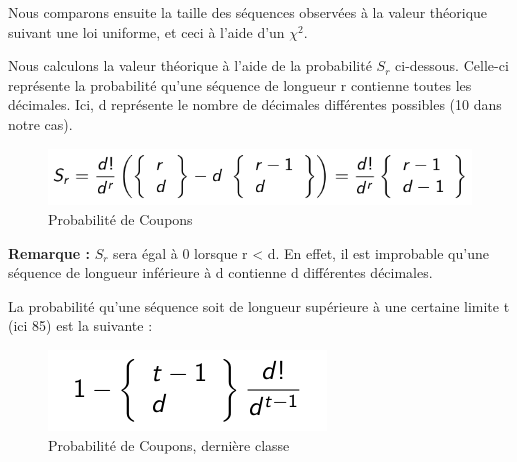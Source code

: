\documentclass[10pt,a4paper]{article}
\begin{document}
Nous comparons ensuite la taille des séquences observées à la valeur théorique suivant une loi uniforme, et ceci à l'aide d'un $\chi^2$.

Nous calculons la valeur théorique à l'aide de la probabilité $ S_r$ ci-dessous. Celle-ci représente la probabilité qu'une séquence de longueur r contienne toutes les décimales. Ici, d représente le nombre de décimales différentes possibles (10 dans notre cas).

\begin{figure}[h]
		\centering
\includegraphics[scale=0.4]{images/formule.png}  
\caption{Probabilité de Coupons}
	\end{figure}

\textbf{Remarque :} $S_r$ sera égal à 0 lorsque r < d. En effet, il est improbable qu'une séquence de longueur inférieure à d contienne d différentes décimales.

La probabilité qu'une séquence soit de longueur supérieure à une certaine limite t (ici 85) est la suivante :

\begin{figure}[h]
		\centering
\includegraphics[scale=0.4]{images/formule2.png}  
\caption{Probabilité de Coupons, dernière classe}
	\end{figure}
\end{document}
